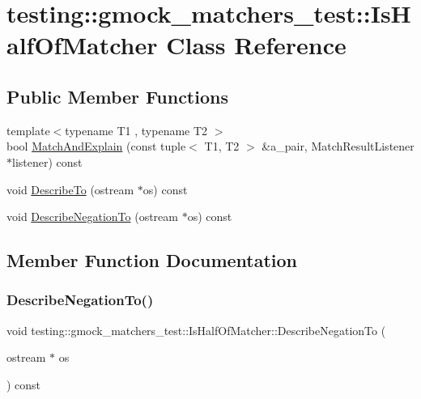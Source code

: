 \hypertarget{classtesting_1_1gmock__matchers__test_1_1_is_half_of_matcher}{}\section{testing\+::gmock\+\_\+matchers\+\_\+test\+::Is\+Half\+Of\+Matcher Class Reference}
\label{classtesting_1_1gmock__matchers__test_1_1_is_half_of_matcher}
\subsection*{Public Member Functions}
\begin{DoxyCompactItemize}
\item 
{\footnotesize template$<$typename T1 , typename T2 $>$ }\\bool \mbox{\hyperlink{classtesting_1_1gmock__matchers__test_1_1_is_half_of_matcher_a8c919d71f6f7e05ac76c67f37107808c}{Match\+And\+Explain}} (const tuple$<$ T1, T2 $>$ \&a\+\_\+pair, Match\+Result\+Listener $\ast$listener) const
\item 
void \mbox{\hyperlink{classtesting_1_1gmock__matchers__test_1_1_is_half_of_matcher_aaf62b9984288cc339599286352d82e91}{Describe\+To}} (ostream $\ast$os) const
\item 
void \mbox{\hyperlink{classtesting_1_1gmock__matchers__test_1_1_is_half_of_matcher_a759ba45c89acfa77a4e1afe95e7b768d}{Describe\+Negation\+To}} (ostream $\ast$os) const
\end{DoxyCompactItemize}


\subsection{Member Function Documentation}
\mbox{\label{classtesting_1_1gmock__matchers__test_1_1_is_half_of_matcher_a759ba45c89acfa77a4e1afe95e7b768d}} 
\subsubsection{\texorpdfstring{DescribeNegationTo()}{DescribeNegationTo()}}
{\footnotesize\ttfamily void testing\+::gmock\+\_\+matchers\+\_\+test\+::\+Is\+Half\+Of\+Matcher\+::\+Describe\+Negation\+To (\begin{DoxyParamCaption}\item[{ostream $\ast$}]{os }\end{DoxyParamCaption}) const\hspace{0.3cm}{\ttfamily [inline]}}

